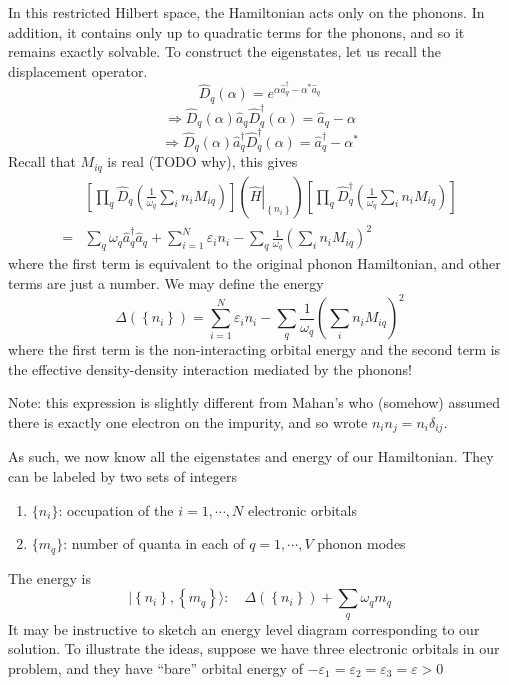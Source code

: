 In this restricted Hilbert space, the Hamiltonian acts only on the phonons. In addition, it contains only up to quadratic terms for the phonons, and so it remains exactly solvable. To construct the eigenstates, let us recall the displacement operator.
\[ \hat{D}_q\left( \alpha \right) =e^{\alpha \hat{a}_{q}^{\dagger}-\alpha ^*\hat{a}_q}\]
\[ \Rightarrow \hat{D}_q\left( \alpha \right) \hat{a}_q\hat{D}_{q}^{\dagger}\left( \alpha \right) =\hat{a}_q-\alpha \]
\[ \Rightarrow \hat{D}_q\left( \alpha \right) \hat{a}_{q}^{\dagger}\hat{D}_{q}^{\dagger}\left( \alpha \right) =\hat{a}_{q}^{\dagger}-\alpha ^*\]
Recall that $M_{iq}$ is real (TODO why), this gives
\begin{align*}
    &\left[ \prod_q{\hat{D}_q\left( \frac{1}{\omega _q}\sum_i{n_iM_{iq}} \right)} \right] \left( \left. \hat{H} \right|_{\left\{ n_i \right\}} \right) \left[ \prod_q{\hat{D}_{q}^{\dagger}\left( \frac{1}{\omega _q}\sum_i{n_iM_{iq}} \right)} \right] \\
    =&\sum_q{\omega _q\hat{a}_{q}^{\dagger}\hat{a}_q}+\sum_{i=1}^N{\varepsilon _in_i}-\sum_q{\frac{1}{\omega _{q}}\left( \sum_i{n_iM_{iq}} \right) ^2}
\end{align*}
where the first term is equivalent to the original phonon Hamiltonian, and other terms are just a number. We may define the energy
\[ \Delta \left( \left\{ n_i \right\} \right) =\sum_{i=1}^N{\varepsilon _in_i}-\sum_q{\frac{1}{\omega _q}\left( \sum_i{n_iM_{iq}} \right) ^2}\]
where the first term is the non-interacting orbital energy and the second term is the effective density-density interaction mediated by the phonons!

Note: this expression is slightly different from Mahan's who (somehow) assumed there is exactly one electron on the impurity, and so wrote $n_in_j=n_i\delta_{ij}$.

As such, we now know all the eigenstates and energy of our Hamiltonian. They can be labeled by two sets of integers
\begin{enumerate}
    \item $\{n_i\}$: occupation of the $i=1,\cdots,N$ electronic orbitals
    \item $\{m_q\}$: number of quanta in each of $q=1,\cdots,V$ phonon modes
\end{enumerate}
The energy is
\[ |\left\{ n_i \right\} ,\left\{ m_q \right\} \rangle :\quad \Delta \left( \left\{ n_i \right\} \right) +\sum_q{\omega _qm_q}\]
It may be instructive to sketch an energy level diagram corresponding to our solution. To illustrate the ideas, suppose we have three electronic orbitals in our problem, and they have ``bare'' orbital energy of $-\varepsilon _1=\varepsilon _2=\varepsilon _3=\varepsilon >0$

